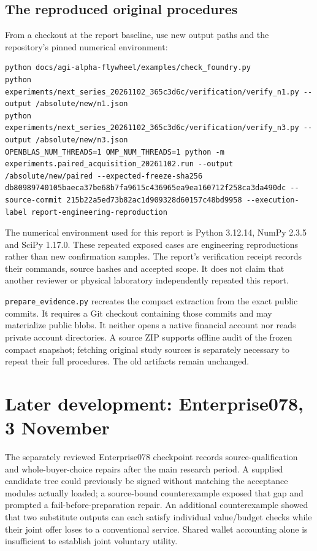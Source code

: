 \subsection{The reproduced original procedures}
From a checkout at the report baseline, use new output paths and the repository's pinned numerical environment:
\begin{lstlisting}
python docs/agi-alpha-flywheel/examples/check_foundry.py
python experiments/next_series_20261102_365c3d6c/verification/verify_n1.py --output /absolute/new/n1.json
python experiments/next_series_20261102_365c3d6c/verification/verify_n3.py --output /absolute/new/n3.json
OPENBLAS_NUM_THREADS=1 OMP_NUM_THREADS=1 python -m experiments.paired_acquisition_20261102.run --output /absolute/new/paired --expected-freeze-sha256 db80989740105baeca37be68b7fa9615c436965ea9ea160712f258ca3da490dc --source-commit 215b22a5ed73b82ac1d909328d60157c48bd9958 --execution-label report-engineering-reproduction
\end{lstlisting}
The numerical environment used for this report is Python 3.12.14, NumPy 2.3.5 and SciPy 1.17.0. These repeated exposed cases are engineering reproductions rather than new confirmation samples. The report's verification receipt records their commands, source hashes and accepted scope. It does not claim that another reviewer or physical laboratory independently repeated this report.

\texttt{prepare\_evidence.py} recreates the compact extraction from the exact public commits. It requires a Git checkout containing those commits and may materialize public blobs. It neither opens a native financial account nor reads private account directories. A source ZIP supports offline audit of the frozen compact snapshot; fetching original study sources is separately necessary to repeat their full procedures. The old artifacts remain unchanged.

\section{Later development: Enterprise078, 3 November}
The separately reviewed Enterprise078 checkpoint \cite{enterprise078} records source-qualification and whole-buyer-choice repairs after the main research period. A supplied candidate tree could previously be signed without matching the acceptance modules actually loaded; a source-bound counterexample exposed that gap and prompted a fail-before-preparation repair. An additional counterexample showed that two substitute outputs can each satisfy individual value/budget checks while their joint offer loses to a conventional service. Shared wallet accounting alone is insufficient to establish joint voluntary utility.

